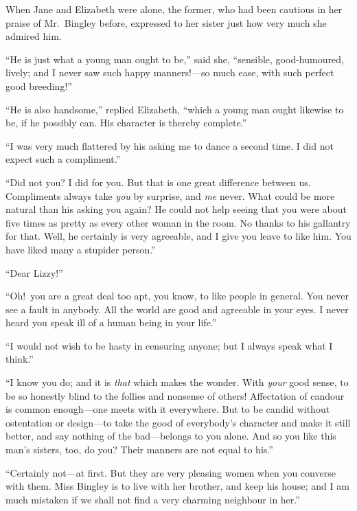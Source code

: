 \documentclass[12pt,english,oneside]{book}
\begin{document}

When Jane and Elizabeth were alone, the former, who had been cautious
in her praise of Mr.\ Bingley before, expressed to her sister just
how very much she admired him.

{}``He is just what a young man ought to be,'' said she, {}``sensible,
good-humoured, lively; and I never saw such happy manners!\mbox{---}so
much ease, with such perfect good breeding!''\ 

{}``He is also handsome,'' replied Elizabeth, {}``which a young
man ought likewise to be, if he possibly can. His character is thereby
complete.''

{}``I was very much flattered by his asking me to dance a second
time. I did not expect such a compliment.''

{}``Did not you? I did for you. But that is one great difference
between us. Compliments always take \textit{you} by surprise, and
\textit{me} never. What could be more natural than his asking you
again? He could not help seeing that you were about five times as
pretty as every other woman in the room. No thanks to his gallantry
for that. Well, he certainly is very agreeable, and I give you leave
to like him. You have liked many a stupider person.''

{}``Dear Lizzy!''\ 

{}``Oh!\ you are a great deal too apt, you know, to like people
in general. You never see a fault in anybody. All the world are good
and agreeable in your eyes. I never heard you speak ill of a human
being in your life.''

{}``I would not wish to be hasty in censuring anyone; but I always
speak what I think.''

{}``I know you do; and it is \textit{that} which makes the wonder.
With \textit{your} good sense, to be so honestly blind to the follies
and nonsense of others! Affectation of candour is common enough\mbox{---}one
meets with it everywhere. But to be candid without ostentation or
design\mbox{---}to take the good of everybody's character and make
it still better, and say nothing of the bad\mbox{---}belongs to you
alone. And so you like this man's sisters, too, do you? Their manners
are not equal to his.''

{}``Certainly not\mbox{---}at first. But they are very pleasing
women when you converse with them. Miss Bingley is to live with her
brother, and keep his house; and I am much mistaken if we shall not
find a very charming neighbour in her.''
\end{document}
